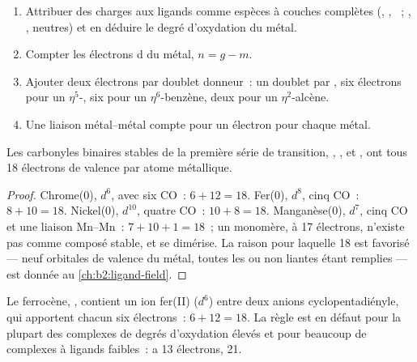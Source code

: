 \begin{method}\label{met:b2:coordination-complexes:electron-count}
\begin{enumerate}
  \item Attribuer des charges aux ligands comme espèces à couches complètes (, ,
        ~; , ,  neutres) et en déduire le degré d'oxydation
        du métal.
  \item Compter les électrons d du métal, $n = g - m$.
  \item Ajouter deux électrons par doublet donneur~: un doublet par , six électrons pour un
        $\eta^5$-, six pour un $\eta^6$-benzène, deux pour un $\eta^2$-alcène.
  \item Une liaison métal--métal compte pour un électron pour chaque métal.
\end{enumerate}
\end{method}

\begin{proposition}\label{prop:b2:coordination-complexes:eighteen}
Les carbonyles binaires stables de la première série de transition, ,
,  et , ont tous 18 électrons de valence par atome
métallique.
\end{proposition}

\begin{proof}
Chrome(0), $d^6$, avec six CO~: $6 + 12 = 18$. Fer(0), $d^8$, cinq CO~: $8 + 10 = 18$.
Nickel(0), $d^{10}$, quatre CO~: $10 + 8 = 18$. Manganèse(0), $d^7$, cinq CO et une
liaison Mn--Mn~: $7 + 10 + 1 = 18$~; un  monomère, à 17 électrons, n'existe pas comme
composé stable, et se dimérise. La raison pour laquelle 18 est favorisé --- neuf orbitales de valence
du métal, toutes les  ou non liantes étant remplies --- est donnée au
\cref{ch:b2:ligand-field}.
\end{proof}

Le ferrocène, , contient un ion fer(II) ($d^6$) entre deux
anions cyclopentadiényle, qui apportent chacun six électrons~: $6 + 12 = 18$. La règle est en défaut pour
la plupart des complexes de degrés d'oxydation élevés et pour beaucoup de complexes à ligands faibles~: 
a 13 électrons,  21.


